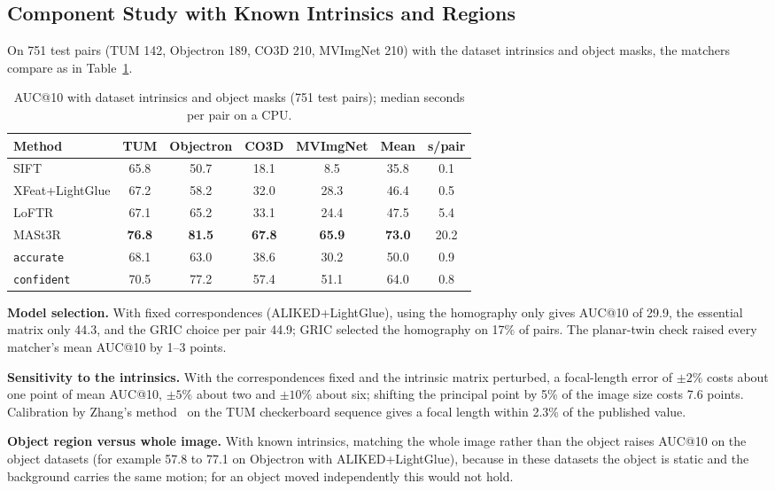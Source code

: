 \documentclass[journal]{IEEEtran}
\begin{document}
\subsection{Component Study with Known Intrinsics and Regions}
On 751 test pairs (TUM 142, Objectron 189, CO3D 210, MVImgNet 210) with the dataset intrinsics and object masks, the matchers compare as in Table~\ref{tab:bench}.

\begin{table}[H]
\centering
\caption{AUC@10 with dataset intrinsics and object masks (751 test pairs); median seconds per pair on a CPU.}\label{tab:bench}
\small\setlength{\tabcolsep}{3pt}
\begin{tabular}{lcccccc}
\toprule
Method & TUM & Objectron & CO3D & MVImgNet & Mean & s/pair\\
\midrule
SIFT & 65.8 & 50.7 & 18.1 & 8.5 & 35.8 & 0.1\\
XFeat+LightGlue & 67.2 & 58.2 & 32.0 & 28.3 & 46.4 & 0.5\\
LoFTR & 67.1 & 65.2 & 33.1 & 24.4 & 47.5 & 5.4\\
MASt3R & \textbf{76.8} & \textbf{81.5} & \textbf{67.8} & \textbf{65.9} & \textbf{73.0} & 20.2\\
\midrule
\texttt{accurate} & 68.1 & 63.0 & 38.6 & 30.2 & 50.0 & 0.9\\
\texttt{confident} & 70.5 & 77.2 & 57.4 & 51.1 & 64.0 & 0.8\\
\bottomrule
\end{tabular}


\end{table}

\textbf{Model selection.} With fixed correspondences (ALIKED+LightGlue), using the homography only gives AUC@10 of 29.9, the essential matrix only 44.3, and the GRIC choice per pair 44.9; GRIC selected the homography on 17\% of pairs. The planar-twin check raised every matcher's mean AUC@10 by 1--3 points.

\textbf{Sensitivity to the intrinsics.} With the correspondences fixed and the intrinsic matrix perturbed, a focal-length error of $\pm2\%$ costs about one point of mean AUC@10, $\pm5\%$ about two and $\pm10\%$ about six; shifting the principal point by 5\% of the image size costs 7.6 points. Calibration by Zhang's method~\cite{zhang} on the TUM checkerboard sequence gives a focal length within 2.3\% of the published value.

\textbf{Object region versus whole image.} With known intrinsics, matching the whole image rather than the object raises AUC@10 on the object datasets (for example 57.8 to 77.1 on Objectron with ALIKED+LightGlue), because in these datasets the object is static and the background carries the same motion; for an object moved independently this would not hold.
\end{document}
